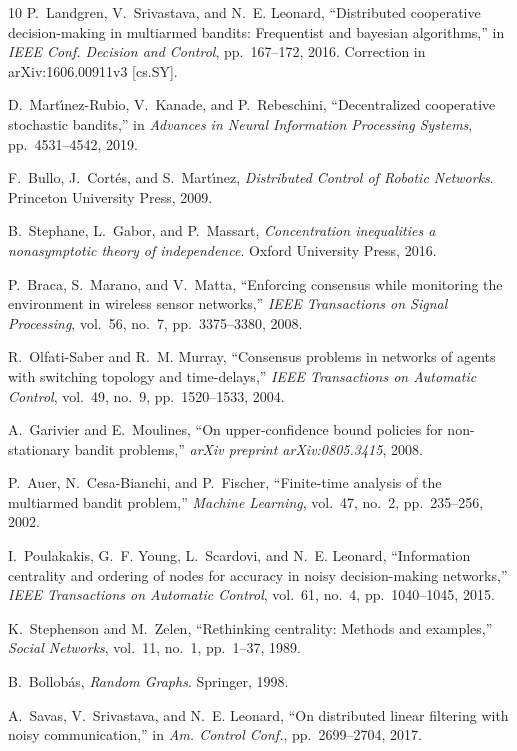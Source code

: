 \documentclass[final,5p,times,twocolumn]{elsarticle}
\theoremstyle{definition}
\begin{document}
\begin{thebibliography}{10}
	P.~Landgren, V.~Srivastava, and N.~E. Leonard, ``Distributed cooperative
	decision-making in multiarmed bandits: Frequentist and bayesian algorithms,''
	in {\em IEEE Conf. Decision and Control}, pp.~167--172, 2016.
	\newblock Correction in arXiv:1606.00911v3 [cs.SY].
	
	D.~Mart{\'\i}nez-Rubio, V.~Kanade, and P.~Rebeschini, ``Decentralized
	cooperative stochastic bandits,'' in {\em Advances in Neural Information
		Processing Systems}, pp.~4531--4542, 2019.
	
	F.~Bullo, J.~Cort{\'e}s, and S.~Mart{\'\i}nez, {\em Distributed Control of
		Robotic Networks}.
	\newblock Princeton University Press, 2009.
	
	B.~Stephane, L.~Gabor, and P.~Massart, {\em Concentration inequalities a
		nonasymptotic theory of independence}.
	\newblock Oxford University Press, 2016.
	
	P.~Braca, S.~Marano, and V.~Matta, ``Enforcing consensus while monitoring the
	environment in wireless sensor networks,'' {\em IEEE Transactions on Signal
		Processing}, vol.~56, no.~7, pp.~3375--3380, 2008.
	
	R.~Olfati-Saber and R.~M. Murray, ``Consensus problems in networks of agents
	with switching topology and time-delays,'' {\em IEEE Transactions on
		Automatic Control}, vol.~49, no.~9, pp.~1520--1533, 2004.
	
	A.~Garivier and E.~Moulines, ``On upper-confidence bound policies for
	non-stationary bandit problems,'' {\em arXiv preprint arXiv:0805.3415}, 2008.
	
	P.~Auer, N.~Cesa-Bianchi, and P.~Fischer, ``Finite-time analysis of the
	multiarmed bandit problem,'' {\em Machine Learning}, vol.~47, no.~2,
	pp.~235--256, 2002.
	
	I.~Poulakakis, G.~F. Young, L.~Scardovi, and N.~E. Leonard, ``Information
	centrality and ordering of nodes for accuracy in noisy decision-making
	networks,'' {\em IEEE Transactions on Automatic Control}, vol.~61, no.~4,
	pp.~1040--1045, 2015.
	
	K.~Stephenson and M.~Zelen, ``Rethinking centrality: Methods and examples,''
	{\em Social Networks}, vol.~11, no.~1, pp.~1--37, 1989.
	
	B.~Bollob{\'a}s, {\em Random Graphs}.
	\newblock Springer, 1998.
	
	A.~Savas, V.~Srivastava, and N.~E. Leonard, ``On distributed linear filtering
	with noisy communication,'' in {\em Am. Control Conf.}, pp.~2699--2704, 2017.
	
\end{thebibliography}
\end{document}
